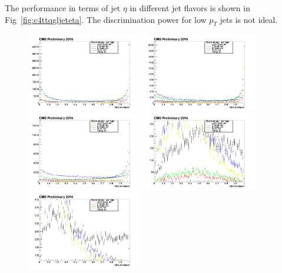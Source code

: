 The performance in terms of jet $\eta$ in different jet flavors is shown in Fig~\ref{fig:c4ttqgljeteta}. The discrimination power for low $p_{T}$ jets is not ideal. 
\begin{figure}[htbp]
 \begin{center}
  \includegraphics[width=0.45\textwidth]{sections/mc4/TopTagger/figures/_b_qglikelihoodjetetabin0_.png}
  \includegraphics[width=0.45\textwidth]{sections/mc4/TopTagger/figures/_b_qglikelihoodjetetabin1_.png} \\
  \includegraphics[width=0.45\textwidth]{sections/mc4/TopTagger/figures/_b_qglikelihoodjetetabin2_.png}
  \includegraphics[width=0.45\textwidth]{sections/mc4/TopTagger/figures/_b_qglikelihoodjetetabin3_.png} \\
  \includegraphics[width=0.45\textwidth]{sections/mc4/TopTagger/figures/_b_qglikelihoodjetetabin4_.png}

\end{center}
\end{figure}
